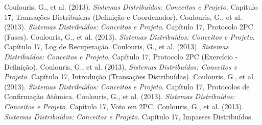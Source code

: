 \documentclass[12pt, a4paper]{article}
\begin{document}
\begin{thebibliography}{99}
 Coulouris, G., et al. (2013). \textit{Sistemas Distribuídos: Conceitos e Projeto}. Capítulo 17, Transações Distribuídas (Definição e Coordenador).
 Coulouris, G., et al. (2013). \textit{Sistemas Distribuídos: Conceitos e Projeto}. Capítulo 17, Protocolo 2PC (Fases).
 Coulouris, G., et al. (2013). \textit{Sistemas Distribuídos: Conceitos e Projeto}. Capítulo 17, Log de Recuperação.
 Coulouris, G., et al. (2013). \textit{Sistemas Distribuídos: Conceitos e Projeto}. Capítulo 17, Protocolo 2PC (Exercício - Definição).
 Coulouris, G., et al. (2013). \textit{Sistemas Distribuídos: Conceitos e Projeto}. Capítulo 17, Introdução (Transações Distribuídas).
 Coulouris, G., et al. (2013). \textit{Sistemas Distribuídos: Conceitos e Projeto}. Capítulo 17, Protocolos de Confirmação Atômica.
 Coulouris, G., et al. (2013). \textit{Sistemas Distribuídos: Conceitos e Projeto}. Capítulo 17, Voto em 2PC.
 Coulouris, G., et al. (2013). \textit{Sistemas Distribuídos: Conceitos e Projeto}. Capítulo 17, Impasses Distribuídos.
\end{thebibliography}
\end{document}
